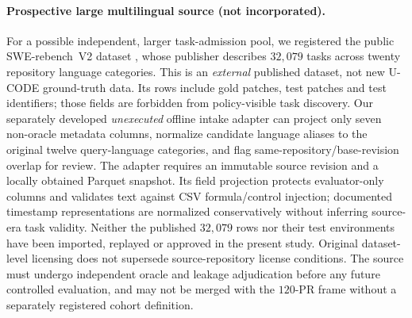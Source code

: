 \documentclass[pdflatex,sn-basic]{sn-jnl}
\begin{document}
\paragraph{Prospective large multilingual source (not incorporated).}
For a possible independent, larger task-admission pool,
we registered the public SWE-rebench~V2 dataset
\cite{badertdinov2026swerebench}, whose publisher
describes $32{,}079$ tasks across twenty repository
language categories. This is an \emph{external}
published dataset, not new U-CODE ground-truth data.
Its rows include gold patches, test patches and
test identifiers; those fields are forbidden from
policy-visible task discovery. Our separately
developed \emph{unexecuted} offline intake adapter
can project only seven non-oracle metadata columns,
normalize candidate language aliases to the original
twelve query-language categories, and flag
same-repository/base-revision overlap for review.
The adapter requires an immutable source revision and
a locally obtained Parquet snapshot. Its field
projection protects evaluator-only columns
and validates text against CSV formula/control
injection; documented timestamp representations
are normalized conservatively without inferring
source-era task validity. Neither the
published $32{,}079$ rows nor their test environments
have been imported, replayed or approved in the
present study. Original dataset-level licensing
does not supersede source-repository license
conditions. The source must undergo independent
oracle and leakage adjudication before any
future controlled evaluation, and may not be
merged with the $120$-PR frame without a
separately registered cohort definition.
\end{document}
